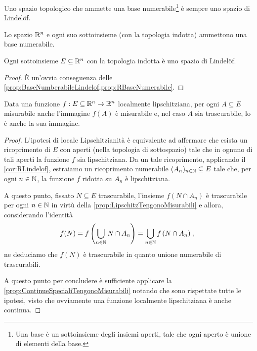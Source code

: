 \begin{proposition}\label{prop:BaseNumberabileLindelof}
	Uno spazio topologico che ammette una base numerabile\footnote{Una base è un sottoinsieme degli insiemi aperti, tale che ogni aperto è unione di elementi della base.} è sempre uno spazio di Lindelöf.
\end{proposition}

\begin{proposition}\label{prop:RBaseNumerabile}
	Lo spazio $\mathbb R^n$ e ogni suo sottoinsieme (con la topologia indotta) ammettono una base numerabile.
\end{proposition}

\begin{corollary}\label{cor:RLindelof}
	Ogni sottoinsieme $E\subseteq \mathbb R^n$ con la topologia indotta è uno spazio di Lindelöf.
\end{corollary}
\begin{proof}
	È un'ovvia conseguenza delle \cref{prop:BaseNumberabileLindelof,prop:RBaseNumerabile}.
\end{proof}

\begin{corollary}\label{cor:LocLipschitzTengonoMisurabili}
	Data una funzione $f:E\subseteq \mathbb R^n\to\mathbb R^n$ localmente lipschitziana, per ogni $A\subseteq E$ misurabile anche l'immagine $f(A)$ è misurabile e, nel caso $A$ sia trascurabile, lo è anche la sua immagine.
\end{corollary}
\begin{proof}
	L'ipotesi di locale Lipschitzianità è equivalente ad affermare che esista un ricoprimento di $E$ con aperti (nella topologia di sottospazio) tale che in ognuno di tali aperti la funzione $f$ sia lipschitziana. 
	Da un tale ricoprimento, applicando il \cref{cor:RLindelof}, estraiamo un ricoprimento numerabile $(A_n)_{n\in\mathbb N}\subseteq E$ tale che, per ogni $n\in\mathbb N$, la funzione $f$ ridotta su $A_n$ è lipschitziana.
	
	A questo punto, fissato $N\subseteq E$ trascurabile, l'insieme $f(N\cap A_n)$ è trascurabile per ogni $n\in\mathbb N$ in virtù della \cref{prop:LipschitzTengonoMisurabili} e allora,  considerando l'identità
	\begin{equation*}
		f(N)=f\left(\bigcup_{n\in\mathbb N} N\cap A_n \right)= \bigcup_{n\in\mathbb N} f\left(N\cap A_n\right)\, \text{, }
	\end{equation*}
	ne deduciamo che $f(N)$ è trascurabile in quanto unione numerabile di trascurabili.
	
	A questo punto per concludere è sufficiente applicare la \cref{prop:ContinueSpecialiTengonoMisurabili} notando che sono rispettate tutte le ipotesi, visto che ovviamente una funzione localmente lipschitziana è anche continua.
\end{proof}


